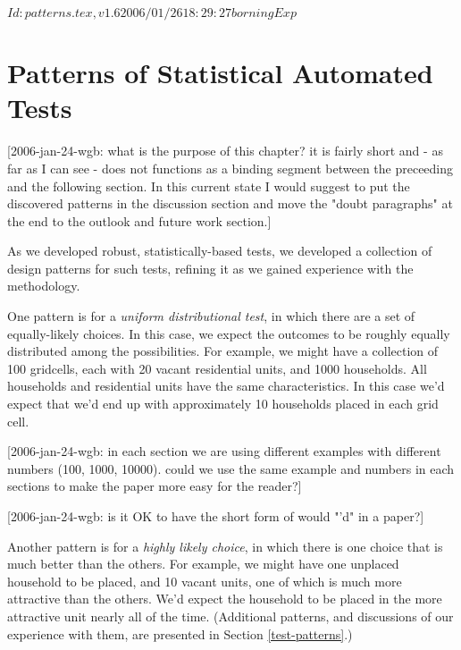 $Id: patterns.tex,v 1.6 2006/01/26 18:29:27 borning Exp $


\section{Patterns of Statistical Automated Tests}

[2006-jan-24-wgb: what is the purpose of this chapter? it is fairly short and - as far
as I can see - does not functions as a binding segment between the preceeding and the
following section.  In this current state I would suggest to put the discovered
patterns in the discussion section and move the "doubt paragraphs" at the end to the
outlook and future work section.]

As we developed robust, statistically-based tests, we developed a collection of 
design patterns for such tests, refining it as we gained experience with the 
methodology.


One pattern is for a \emph{uniform distributional test}, in which there are
a set of equally-likely choices.  In this case, we expect the outcomes to
be roughly equally distributed among the possibilities.  For example, we
might have a collection of 100 gridcells, each with 20 vacant residential
units, and 1000 households.  All households and residential units have the
same characteristics.  In this case we'd expect that we'd end up with
approximately 10 households placed in each grid cell.

[2006-jan-24-wgb: in each section we are using different examples with different numbers (100, 1000, 10000). could we use the same example and numbers in each sections to make the paper more easy for the reader?]

[2006-jan-24-wgb: is it OK to have the short form of would "'d" in a paper?]

Another pattern is for a \emph{highly likely choice}, in which there is one
choice that is much better than the others.  For example, we might have one
unplaced household to be placed, and 10 vacant units, one of which is much
more attractive than the others.  We'd expect the household to be placed in
the more attractive unit nearly all of the time.
(Additional patterns, and discussions of our experience with them, are
presented in Section \ref{test-patterns}.)

